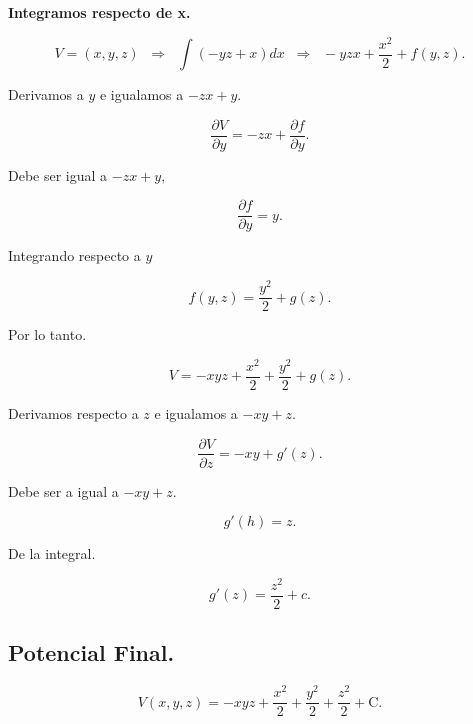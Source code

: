\documentclass[a4paper,12pt]{article} %
\begin{document}
\begin{justify}
	\textbf{Integramos respecto de x.}
\end{justify}

\[V = \left(x, y ,z\right) \;\; \Rightarrow \;\; \int \left(-yz + x\right) dx \;\; \Rightarrow \;\; -yzx + \frac{x^2}{2}+ f\left(y,z\right).  \]

\begin{justify}
	Derivamos a \(y\) e igualamos a \(-zx +y.\)
\end{justify}

\[\frac{\partial V}{\partial y} = -zx + \frac{\partial f}{\partial y}.\]

\begin{justify}
	Debe ser igual a \(-zx + y,\)
\end{justify}

\[ \frac{\partial f}{\partial y} = y. \]

\begin{justify}
	Integrando respecto a \(y\)
\end{justify}

\[ f\left(y,z\right) = \frac{y^2}{2}+ g\left(z\right). \]

\begin{justify}
	Por lo tanto.
\end{justify}

\[ V = -xyz + \frac{x^2}{2} + \frac{y^2}{2} +g\left(z\right).\]

\begin{justify}
	Derivamos respecto a \(z\) e igualamos a \(-xy +z.\)
\end{justify}

\[ \frac{\partial V}{\partial z} = -xy + g'\left(z\right). \]

\begin{justify}
	Debe ser a igual a \(-xy + z.\)
\end{justify}

\[g'\left(h\right) = z.\]

\begin{justify}
	De la integral.
\end{justify}

\[ g'\left( z \right) = \frac{z^2}{2} + c. \]

\subsection{Potencial Final.}

\[ V\left(x, y, z\right) = -xyz + \frac{x^2}{2} + \frac{y^2}{2} + \frac{z^2}{2} + \mathrm{C}.\]
\end{document}
